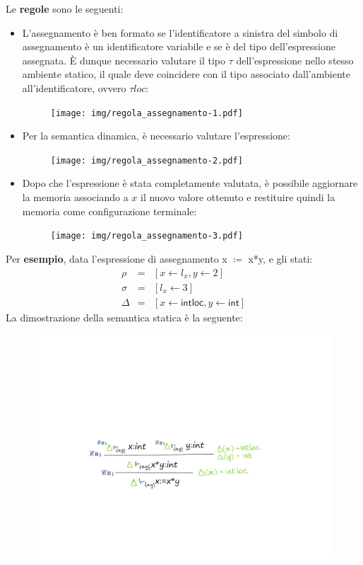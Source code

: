 \documentclass[a4paper]{article}
\begin{document}
 	\noindent
 	Le \textbf{regole} sono le seguenti:
 	\begin{itemize}
 		\item L'assegnamento è ben formato se l'identificatore a sinistra del simbolo di assegnamento è un identificatore variabile e se è del tipo dell'espressione assegnata. È dunque necessario valutare il tipo $\tau$ dell'espressione nello stesso ambiente statico, il quale deve coincidere con il tipo associato dall'ambiente all'identificatore, ovvero $\tau loc$:
 		\begin{figure}[!htp]
 			\centering
 			\texttt{[image: img/regola\_assegnamento-1.pdf]}
 		\end{figure}
 		
 		\item Per la semantica dinamica, è necessario valutare l'espressione:
 		\begin{figure}[!htp]
 			\centering
 			\texttt{[image: img/regola\_assegnamento-2.pdf]}
 		\end{figure}
 		
 		\item Dopo che l'espressione è stata completamente valutata, è possibile aggiornare la memoria associando a $x$ il nuovo valore ottenuto e restituire quindi la memoria come configurazione terminale:
 		\begin{figure}[!htp]
 			\centering
 			\texttt{[image: img/regola\_assegnamento-3.pdf]}
 		\end{figure}
 	\end{itemize}
 	Per \textcolor{Green4}{\textbf{esempio}}, data l'espressione di assegnamento \textsf{x $\coloneq$ x*y}, e gli stati:
 	\begin{equation*}
 		\begin{array}{lll}
 			\rho	& = & \left[x \leftarrow l_{x}, y \leftarrow 2 \right] \\
 			\sigma	& = & \left[l_{x} \leftarrow 3\right] \\
 			\Delta	& = & \left[x \leftarrow \mathsf{intloc}, y \leftarrow \textsf{int}\right]
 		\end{array}
 	\end{equation*}
 	La dimostrazione della semantica statica è la seguente:
 	\begin{figure}[!htp]
 		\centering
 		\includegraphics[width=.8\textwidth]{img/esempio_assegnamento_sem-statica.pdf}
 	\end{figure}\newpage
 	
\end{document}
